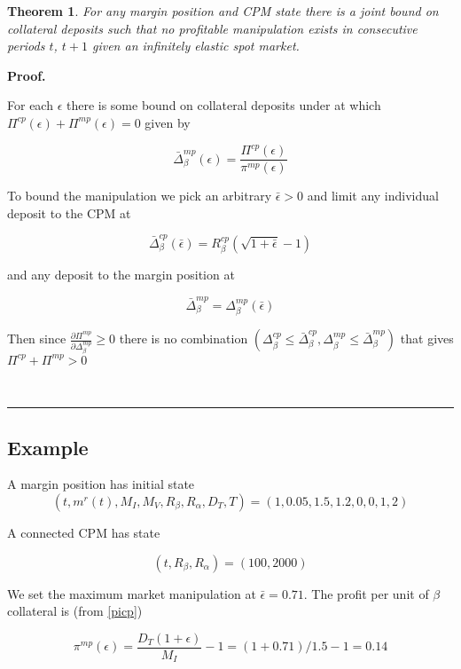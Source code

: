 \documentclass[12pt]{article}
\newtheorem{theorem}{Theorem}
\newenvironment{proof}[1][Proof]{\noindent\textbf{#1.} }{\ \rule{0.5em}{0.5em}}
\begin{document}
\begin{theorem}
\label{depositBounds}
For any margin position and CPM state there is a joint bound on collateral deposits such that no profitable manipulation exists in consecutive periods $t$, $t+1$ given an infinitely elastic spot market.
\end{theorem}

\begin{proof}

For each $\epsilon$ there is some bound on collateral deposits under at which $\Pi^{cp}(\epsilon) +\Pi^{mp}(\epsilon) = 0$ given by

\begin{equation}
\label{boundaryDeltamp}
\bar{\Delta}_\beta^{mp}(\epsilon) = \frac{\Pi^{cp}(\epsilon)}{\pi^{mp}(\epsilon) }
\end{equation}

To bound the manipulation we pick an arbitrary $\bar{\epsilon}>0$ and limit any individual deposit to the CPM at

\begin{equation}
\label{boundaryDeltacp}
\bar{\Delta}_\beta^{cp}(\bar{\epsilon})  = R_\beta^{cp}(\sqrt{1+\bar{\epsilon}} -1)
\end{equation}

and any deposit to the margin position at 

\[ \bar{\Delta}_\beta^{mp} = \Delta_\beta^{mp} (\bar{\epsilon}) \]

Then since $\frac{\partial \Pi^{mp}}{\partial \Delta_\beta^{mp} }\geq 0$  there is no combination $(\Delta_\beta^{cp} \leq \bar{\Delta}_\beta^{cp}, \Delta_\beta^{mp} \leq \bar{\Delta}_\beta^{mp})$ that gives $\Pi^{cp} +\Pi^{mp} > 0$   

\end{proof}

\subsection*{Example}

A margin position has initial state 
\[(t, m^r(t), M_I, M_V, R_\beta, R_\alpha, D_T, T) = (1, 0.05, 1.5, 1.2, 0, 0, 1, 2)\]

A connected CPM has state 

\[(t, R_\beta, R_\alpha) = (100, 2000)\] 

We set the maximum market manipulation at $\bar{\epsilon} = 0.71$. The profit per unit of $\beta$ collateral is (from \ref{picp})

\[\pi^{mp}(\epsilon) = \frac{D_T(1+\epsilon)}{M_I}-1  = (1+0.71)/1.5-1 = 0.14 \]
\end{document}
